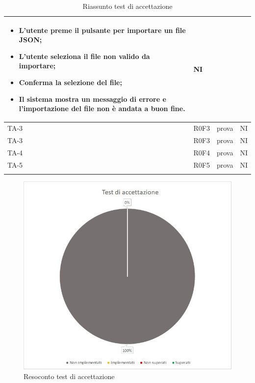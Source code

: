\begin{longtable}{|C{2.5cm}|C{2.5cm}|L{6.5cm}|C{1.5cm}|}
\begin{itemize}
		\item L'utente preme il pulsante per importare un file JSON;
		\item L'utente seleziona il file non valido da importare;
		\item Conferma la selezione del file;
		\item Il sistema mostra un messaggio di errore e l'importazione del file non è andata a buon fine.
	\end{itemize}
	 & {NI}\\
	\hline
	{TA-3} & {R0F3} & prova & {NI}\\
	\hline
	{TA-3} & {R0F3} & prova & {NI}\\
	\hline
	{TA-4} & {R0F4} & prova & {NI}\\
	\hline
	{TA-5} & {R0F5} & prova & {NI}\\
	\hline
	\caption{Riassunto test di accettazione}
	\label{tabella:riassunto ta}
\end{longtable}
\begin{figure} [H]
	\centering
	\includegraphics[scale=1]{Img/TA}
	\caption{Resoconto test di accettazione}\label{}
\end{figure}
\normalsize
\renewcommand{\arraystretch}{1}
\newpage

